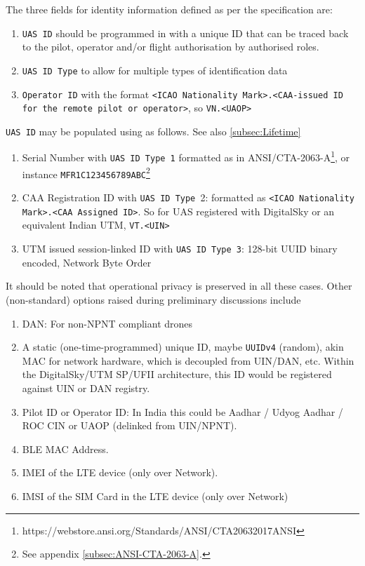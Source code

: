 \documentclass{ua_wgs_base}
\begin{document}
The three fields for identity information defined as per the specification \cite[p10]{ASTM:F3411:19}
are:
\begin{enumerate}
\item \texttt{UAS ID} should be programmed in with a unique ID that can
be traced back to the pilot, operator and/or flight authorisation
by authorised roles.
\item \texttt{UAS ID Type} to allow for multiple types of identification
data
\item \texttt{Operator ID} with the format \texttt{<ICAO Nationality Mark>.<CAA-issued ID for the remote pilot or operator>}, so \texttt{VN.<UAOP>}
\end{enumerate}
\texttt{UAS ID} may be populated using as follows. See also \ref{subsec:Lifetime}
\begin{enumerate}
\item Serial Number with \texttt{UAS ID Type 1} formatted as in ANSI/CTA-2063-A\footnote{https://webstore.ansi.org/Standards/ANSI/CTA20632017ANSI},
or instance \texttt{MFR1C123456789ABC}\footnote{See appendix \ref{subsec:ANSI-CTA-2063-A}.}
\item CAA Registration
ID with \texttt{UAS ID Type }2: formatted as \texttt{<ICAO Nationality
Mark>.<CAA Assigned ID>}. So for UAS registered with DigitalSky or
an equivalent Indian UTM, \texttt{VT.<UIN>}
\item UTM issued session-linked ID with \texttt{UAS ID Type 3}: 128-bit
UUID binary encoded, Network Byte Order
\end{enumerate}
It should be noted that operational privacy is preserved in all these
cases. Other (non-standard) options raised during preliminary discussions
include
\begin{enumerate}
\item DAN: For non-NPNT compliant drones
\item A static (one-time-programmed) unique ID, maybe \texttt{UUIDv4} (random),
akin MAC for network hardware, which is decoupled from UIN/DAN, etc.
Within the DigitalSky/UTM SP/UFII architecture, this ID would be registered against
UIN or DAN registry.
\item Pilot ID or Operator ID: In India this could be Aadhar / Udyog Aadhar
/ ROC CIN or UAOP (delinked from UIN/NPNT). 
\item BLE MAC Address. 
\item IMEI of the LTE device (only over Network). 
\item IMSI of the SIM Card in the LTE device (only over Network)
\end{enumerate}
\end{document}
